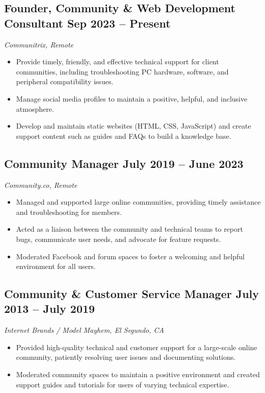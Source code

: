 \documentclass[a4paper,12pt]{article} %
\begin{document}
\subsection{Founder, Community \& Web Development Consultant \hfill Sep 2023 – Present}
\textit{Communitrix, Remote}
\begin{itemize}
    \item Provide timely, friendly, and effective technical support for client communities, including troubleshooting PC hardware, software, and peripheral compatibility issues.
    \item Manage social media profiles to maintain a positive, helpful, and inclusive atmosphere.
    \item Develop and maintain static websites (HTML, CSS, JavaScript) and create support content such as guides and FAQs to build a knowledge base.
\end{itemize}

\subsection{Community Manager \hfill July 2019 – June 2023}
\textit{Community.co, Remote}
\begin{itemize}
    \item Managed and supported large online communities, providing timely assistance and troubleshooting for members.
    \item Acted as a liaison between the community and technical teams to report bugs, communicate user needs, and advocate for feature requests.
    \item Moderated Facebook and forum spaces to foster a welcoming and helpful environment for all users.
\end{itemize}

\subsection{Community \& Customer Service Manager \hfill July 2013 – July 2019}
\textit{Internet Brands / Model Mayhem, El Segundo, CA}
\begin{itemize}
    \item Provided high-quality technical and customer support for a large-scale online community, patiently resolving user issues and documenting solutions.
    \item Moderated community spaces to maintain a positive environment and created support guides and tutorials for users of varying technical expertise.
\end{itemize}
\end{document}
